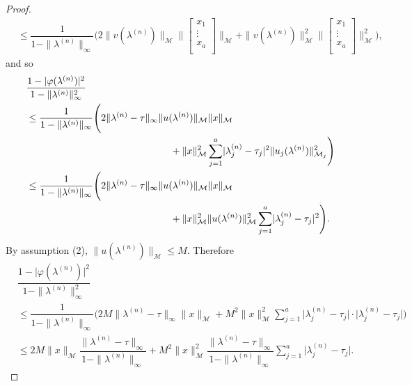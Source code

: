 \documentclass[11pt, reqno]{amsart}
\newcommand\1{\boldsymbol {1}}
\numberwithin{equation}{section}
\begin{document}
\begin{proof}
\begin{align*}
&\leq \dfrac{1}{1-\|\lambda^{(n)}\|_{\infty}}\Bigg(2\|v(\lambda^{(n)})\|_{\mathcal{M}}\Bigg\|\begin{bmatrix}
	x_{1} \\
    \vdots \\
    x_{a}  \\
\end{bmatrix}\Bigg\|_{\mathcal{M}}+\|v(\lambda^{(n)})\|_{\mathcal{M}}^{2}\Bigg\|\begin{bmatrix}
	x_{1} \\
    \vdots \\
    x_{a}  \\
\end{bmatrix}\Bigg\|_{\mathcal{M}}^{2}\Bigg), 
\end{align*}
and so
\begin{align*}
    &\dfrac{1-\lvert \varphi(\lambda^{(n)})\rvert^{2}}{1-\|\lambda^{(n)}\|_{\infty}^{2}}\\
&\leq \dfrac{1}{1-\|\lambda^{(n)}\|_{\infty}}\Bigg(2\|\lambda^{(n)}-\tau\|_{\infty}\|u(\lambda^{(n)})\|_{\mathcal{M}}\|x\|_{\mathcal{M}}\\
&\hspace{5.2cm}+\|x\|^{2}_{\mathcal{M}}\sum_{j=1}^{a}\lvert\lambda^{(n)}_{j}-\tau_{j}\rvert^{2}\|u_{j}(\lambda^{(n)})\|^{2}_{\mathcal{M}_{j}}\Bigg)\\
&\leq \dfrac{1}{1-\|\lambda^{(n)}\|_{\infty}}\Bigg(2\|\lambda^{(n)}-\tau\|_{\infty}\|u(\lambda^{(n)})\|_{\mathcal{M}}\|x\|_{\mathcal{M}}\\
&\hspace{5.2cm}+\|x\|^{2}_{\mathcal{M}}\|u(\lambda^{(n)})\|^{2}_{\mathcal{M}}\sum_{j=1}^{a}\lvert\lambda^{(n)}_{j}-\tau_{j}\rvert^{2}\Bigg).\\
\end{align*}
By assumption (2), $\|u(\lambda^{(n)})\|_{\mathcal{M}}\leq M$. Therefore
\begin{align}
    &\dfrac{1-\lvert \varphi(\lambda^{(n)})\rvert^{2}}{1-\|\lambda^{(n)}\|_{\infty}^{2}} \nonumber\\
    &\leq\dfrac{1}{1-\|\lambda^{(n)}\|_{\infty}}\Bigg(2M\|\lambda^{(n)}-\tau\|_{\infty}\|x\|_{\mathcal{M}}+M^{2}\|x\|^{2}_{\mathcal{M}}\sum_{j=1}^{a}\lvert\lambda^{(n)}_{j}-\tau_{j}\rvert\cdot\lvert\lambda^{(n)}_{j}-\tau_{j}\rvert\Bigg) \nonumber\\
    &\leq 2M\|x\|_{\mathcal{M}}\dfrac{\|\lambda^{(n)}-\tau\|_{\infty}}{1-\|\lambda^{(n)}\|_{\infty}}+M^{2}\|x\|^{2}_{\mathcal{M}}\dfrac{\|\lambda^{(n)}-\tau\|_{\infty}}{1-\|\lambda^{(n)}\|_{\infty}}\sum_{j=1}^{a}\lvert\lambda^{(n)}_{j}-\tau_{j}\rvert. \label{bound4}

\end{align}
\end{proof}
\end{document}
